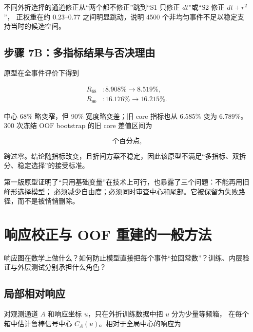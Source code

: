 \documentclass[UTF8,12pt,a4paper,oneside,fontset=none]{ctexart}
\numberwithin{equation}{section}
\newcommand{\Rsixtyeight}{R_{68}}
\newcommand{\Rninety}{R_{90}}
\begin{document}
不同外折选择的通道修正从“两个都不修正”跳到“S1 只修正 \(dt\)”或“S2 修正 \(dt+r^2\)”，
正权重在约 0.23--0.77 之间明显跳动，说明 4500 个非均匀事件不足以稳定支持当时的候选空间。

\subsection{步骤 7B：多指标结果与否决理由}

原型在全事件评价下得到

\begin{align}
\Rsixtyeight &: 8.908\%\longrightarrow8.519\%,
\label{eq:prototype-r68}\\
\Rninety &: 16.176\%\longrightarrow16.215\%.
\label{eq:prototype-r90}
\end{align}

中心 68\% 略变窄，但 90\% 宽度略变差；旧 core 指标也从 \(6.585\%\) 变为 \(6.789\%\)。
300 次冻结 OOF bootstrap 的旧 core 差值区间为

\begin{equation}
[-0.143,+1.476]\ \text{个百分点},
\label{eq:prototype-bootstrap}
\end{equation}

跨过零。结论随指标改变，且折间方案不稳定，因此该原型不满足“多指标、双拆分、稳定选择”的接受标准。

\begin{conclusionbox}
第一版原型证明了“只用基础变量”在技术上可行，也暴露了三个问题：不能再用旧峰形选择模型；
必须减少自由度；必须同时审查中心和尾部。它被保留为失败路径，而不是被悄悄删除。
\end{conclusionbox}

\section{响应校正与 OOF 重建的一般方法}

\begin{questionbox}
响应图在数学上做什么？如何防止模型直接把每个事件“拉回常数”？训练、内层验证与外层测试分别承担什么角色？
\end{questionbox}

\subsection{局部相对响应}

对观测通道 \(A\) 和响应坐标 \(u\)，只在外折训练数据中把 \(u\) 分为少量等频箱，
在每个箱中估计鲁棒信号中心 \(C_A(u)\)。相对于全局中心的响应为
\end{document}
